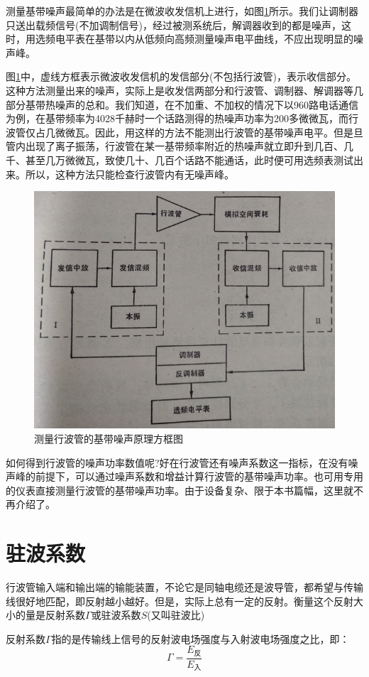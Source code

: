 测量基带噪声最简单的办法是在微波收发信机上进行，如图\ref{ch11-10}所示。我们让调制器只送出载频信号(不加调制信号)，经过被测系统后，解调器收到的都是噪声，这时，用选频电平表在基带以内从低频向高频测量噪声电平曲线，不应出现明显的噪声峰。


图\ref{ch11-10}中，虚线方框\uppercase\expandafter{}表示微波收发信机的发信部分(不包括行波管)，\uppercase\expandafter{}表示收信部分。这种方法测量出来的噪声，实际上是收发信两部分和行波管、调制器、解调器等几部分基带热噪声的总和。我们知道，在不加重、不加权的情况下以960路电话通信为例，在基带频率为4028千赫时一个话路测得的热噪声功率为200多微微瓦，而行波管仅占几微微瓦。因此，用这样的方法不能测出行波管的基带噪声电平。但是旦管内出现了离子振荡，行波管在某一基带频率附近的热噪声就立即升到几百、几千、甚至几万微微瓦，致使几十、几百个话路不能通话，此时便可用选频表测试出来。所以，这种方法只能检查行波管内有无噪声峰。

\begin{figure}[phtb]
	\centering
	\includegraphics[width=0.6\linewidth]{figure/ch11-10}
	\caption{测量行波管的基带噪声原理方框图}
	\label{ch11-10}
\end{figure}

如何得到行波管的噪声功率数值呢?好在行波管还有噪声系数这一指标，在没有噪声峰的前提下，可以通过噪声系数和增益计算行波管的基带噪声功率。也可用专用的仪表直接测量行波管的基带噪声功率。由于设备复杂、限于本书篇幅，这里就不再介绍了。

\section{驻波系数}
行波管输入端和输出端的输能装置，不论它是同轴电缆还是波导管，都希望与传输线很好地匹配，即反射越小越好。但是，实际上总有一定的反射。衡量这个反射大小的量是反射系数$ \varGamma $或驻波系数$ S $(又叫驻波比)


反射系数$ \varGamma $指的是传输线上信号的反射波电场强度与入射波电场强度之比，即：
\begin{equation} \label{eq:11-11}
	\varGamma = \frac{E_\textrm{反}}{E_\textrm{入}}
\end{equation}


